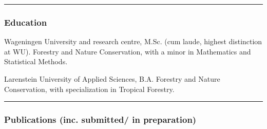 \begin{center}\rule{0.5\linewidth}{\linethickness}\end{center}

\subsubsection{Education}\label{education}

\begin{description}
\tightlist
\item[September, 2009]
Wageningen University and research centre, M.Sc. (cum laude, highest
distinction at WU). Forestry and Nature Conservation, with a minor in
Mathematics and Statistical Methods.
\item[September, 2007]
Larenstein University of Applied Sciences, B.A. Forestry and Nature
Conservation, with specialization in Tropical Forestry.
\end{description}

\begin{center}\rule{0.5\linewidth}{\linethickness}\end{center}

\subsubsection{Publications (inc. submitted/ in
preparation)}\label{publications-inc.-submitted-in-preparation}

